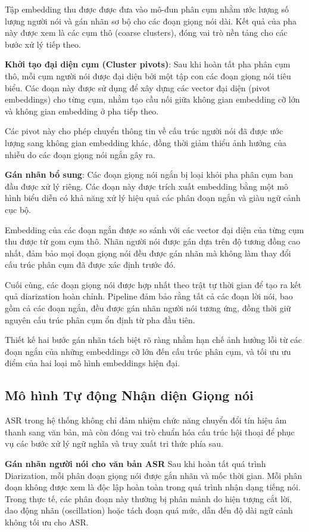 Tập embedding thu được được đưa vào mô-đun phân cụm nhằm ước lượng số lượng người nói và gán nhãn sơ bộ cho các đoạn giọng nói dài. Kết quả của pha này được xem là các cụm thô (coarse clusters), đóng vai trò nền tảng cho các bước xử lý tiếp theo.

\textbf{Khởi tạo đại diện cụm (Cluster pivots)}: Sau khi hoàn tất pha phân cụm thô, mỗi cụm người nói được đại diện bởi một tập con các đoạn giọng nói tiêu biểu. Các đoạn này được sử dụng để xây dựng các vector đại diện (pivot embeddings) cho từng cụm, nhằm tạo cầu nối giữa không gian embedding cỡ lớn và không gian embedding ở pha tiếp theo.

Các pivot này cho phép chuyển thông tin về cấu trúc người nói đã được ước lượng sang không gian embedding khác, đồng thời giảm thiểu ảnh hưởng của nhiễu do các đoạn giọng nói ngắn gây ra.

\textbf{Gán nhãn bổ sung}: Các đoạn giọng nói ngắn bị loại khỏi pha phân cụm ban đầu được xử lý riêng. Các đoạn này được trích xuất embedding bằng một mô hình biểu diễn có khả năng xử lý hiệu quả các phân đoạn ngắn và giàu ngữ cảnh cục bộ.

Embedding của các đoạn ngắn được so sánh với các vector đại diện của từng cụm thu được từ gom cụm thô. Nhãn người nói được gán dựa trên độ tương đồng cao nhất, đảm bảo mọi đoạn giọng nói đều được gán nhãn mà không làm thay đổi cấu trúc phân cụm đã được xác định trước đó.

Cuối cùng, các đoạn giọng nói được hợp nhất theo trật tự thời gian để tạo ra kết quả diarization hoàn chỉnh. Pipeline đảm bảo rằng tất cả các đoạn lời nói, bao gồm cả các đoạn ngắn, đều được gán nhãn người nói tương ứng, đồng thời giữ nguyên cấu trúc phân cụm ổn định từ pha đầu tiên.

Thiết kế hai bước gán nhãn tách biệt rõ ràng nhằm hạn chế ảnh hưởng lỗi từ các đoạn ngắn của những embeddings cỡ lớn đến cấu trúc phân cụm, và tối ưu ưu điểm của hai loại mô hình embeddings hiện đại.

\subsection{Mô hình Tự động Nhận diện Giọng nói}
ASR trong hệ thống không chỉ đảm nhiệm chức năng chuyển đổi tín hiệu âm thanh sang văn bản, mà còn đóng vai trò chuẩn hóa cấu trúc hội thoại để phục vụ các bước xử lý ngữ nghĩa và truy xuất tri thức phía sau.

\textbf{Gán nhãn người nói cho văn bản ASR}
Sau khi hoàn tất quá trình Diarization, mỗi phân đoạn giọng nói được gắn nhãn và mốc thời gian. Mỗi phân đoạn không được xem là độc lập hoàn toàn trong quá trình nhận dạng tiếng nói. Trong thực tế, các phân đoạn này thường bị phân mảnh do hiện tượng cắt lời, dao động nhãn (oscillation) hoặc tách đoạn quá mức, dẫn đến độ dài ngữ cảnh không tối ưu cho ASR.

